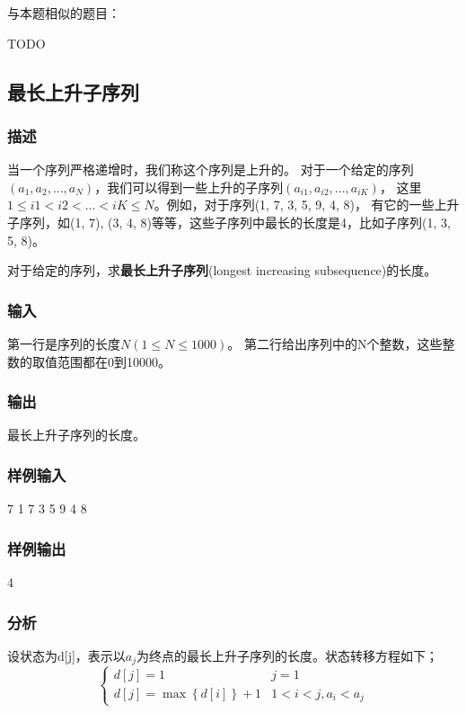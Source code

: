 与本题相似的题目：
\begindot
\item  TODO
\myenddot

\subsection{最长上升子序列}

\subsubsection{描述}
当一个序列严格递增时，我们称这个序列是上升的。
对于一个给定的序列$(a_1, a_2, ..., a_N)$，我们可以得到一些上升的子序列$(a_{i1}, a_{i2}, ..., a_{iK})$，
这里$1 \leq i1 < i2 < ... < iK \leq N$。例如，对于序列(1, 7, 3, 5, 9, 4, 8)，
有它的一些上升子序列，如(1, 7), (3, 4, 8)等等，这些子序列中最长的长度是4，比如子序列(1, 3, 5, 8)。

对于给定的序列，求\textbf{最长上升子序列}(longest increasing subsequence)的长度。

\subsubsection{输入}
第一行是序列的长度$N (1 \leq N \leq 1000)$。
第二行给出序列中的N个整数，这些整数的取值范围都在0到10000。

\subsubsection{输出}
最长上升子序列的长度。

\subsubsection{样例输入}
\begin{Code}
7
1 7 3 5 9 4 8
\end{Code}

\subsubsection{样例输出}
\begin{Code}
4
\end{Code}

\subsubsection{分析}
设状态为d[j]，表示以$a_j$为终点的最长上升子序列的长度。状态转移方程如下；
$$
\begin{cases}
d[j]=1 & j=1\\
d[j]=\max\left\{d[i]\right\}+1 & 1<i<j,a_i<a_j
\end{cases}
$$

